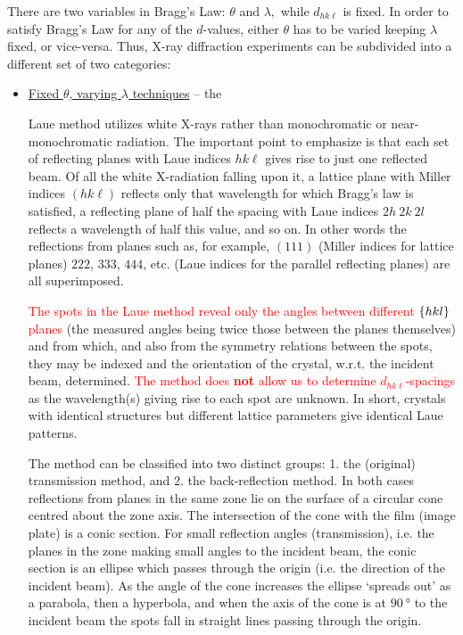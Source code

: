 There are two variables in Bragg's Law: $\theta$ and $\lambda,$ while $d_{hk\ell}$ is fixed. In order to satisfy Bragg's Law for any of the $d$-values, either $\theta$ has to be varied keeping $\lambda$ fixed, or vice-versa. Thus, X-ray diffraction experiments can be subdivided into a different set of two categories:

	\begin{itemize}
	
	    \item \ul{Fixed $\theta$, varying $\lambda$ techniques} -- the 
	    
	    Laue method utilizes white X-rays rather than monochromatic or near-monochromatic radiation. The important point to emphasize is that each set of reflecting planes with Laue indices $h k \ell$ gives rise to just one reflected beam. Of all the white X-radiation falling upon it, a lattice plane with Miller indices $(h k \ell)$ reflects only that wavelength for which Bragg’s law is satisfied, a reflecting plane of half the spacing with Laue indices $2h ~ 2k ~ 2l$ reflects a wavelength of half this value, and so on. In other words the reflections from planes such as, for example, $(111)$ (Miller indices for lattice planes) $222$, $333$, $444$, etc. (Laue indices for the parallel reflecting planes) are all superimposed.
	    
	    \textcolor{red}{The spots in the Laue method reveal only the angles between different $\qty{hkl}$ planes} (the measured angles being twice those between the planes themselves) and from which, and also from the symmetry relations between the spots, they may be indexed and the orientation of the crystal, w.r.t. the incident beam, determined. \textcolor{red}{The method does \textbf{not} allow us to determine $d_{hk\ell}$-spacings} as the wavelength(s) giving rise to each spot are unknown. In short, crystals with identical structures but different lattice parameters give identical Laue patterns.
	    
	    The method can be classified into two distinct groups: 1. the (original) transmission method, and 2. the back-reflection method. In both cases reflections from planes in the same zone lie on the surface of a circular cone centred about the zone axis. The intersection of the cone with the film (image plate) is a conic section. For small reflection angles (transmission), i.e. the planes in the zone making small angles to the incident beam, the conic section is an ellipse which passes through the origin (i.e. the direction of the incident beam). As the angle of the cone increases the ellipse `spreads out' as a parabola, then a hyperbola, and when the axis of the cone is at $\SI{90}{\degree}$ to the incident beam the spots fall in straight lines passing through the origin.
	    

\end{itemize}
